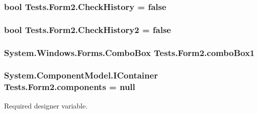 \subsubsection[{\texorpdfstring{Check\+History}{CheckHistory}}]{\setlength{\rightskip}{0pt plus 5cm}bool Tests.\+Form2.\+Check\+History = false\hspace{0.3cm}{\ttfamily [private]}}\hypertarget{class_tests_1_1_form2_a54e155db1ad24014b42f57316c451c8e}{}\label{class_tests_1_1_form2_a54e155db1ad24014b42f57316c451c8e}
\subsubsection[{\texorpdfstring{Check\+History2}{CheckHistory2}}]{\setlength{\rightskip}{0pt plus 5cm}bool Tests.\+Form2.\+Check\+History2 = false\hspace{0.3cm}{\ttfamily [private]}}\hypertarget{class_tests_1_1_form2_a3757cb2e88f63fcddc6eafa8875d8083}{}\label{class_tests_1_1_form2_a3757cb2e88f63fcddc6eafa8875d8083}
\subsubsection[{\texorpdfstring{combo\+Box1}{comboBox1}}]{\setlength{\rightskip}{0pt plus 5cm}System.\+Windows.\+Forms.\+Combo\+Box Tests.\+Form2.\+combo\+Box1\hspace{0.3cm}{\ttfamily [private]}}\hypertarget{class_tests_1_1_form2_a2f3916e9df23010161dc15f6d047abae}{}\label{class_tests_1_1_form2_a2f3916e9df23010161dc15f6d047abae}
\subsubsection[{\texorpdfstring{components}{components}}]{\setlength{\rightskip}{0pt plus 5cm}System.\+Component\+Model.\+I\+Container Tests.\+Form2.\+components = null\hspace{0.3cm}{\ttfamily [private]}}\hypertarget{class_tests_1_1_form2_a7d07edf4796d9dc60c94c70eefc79d72}{}\label{class_tests_1_1_form2_a7d07edf4796d9dc60c94c70eefc79d72}


Required designer variable. 

